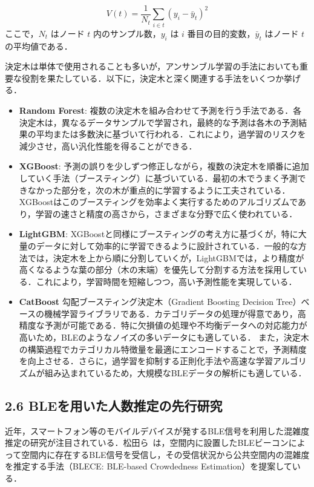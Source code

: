 \begin{equation}
	V(t) = \frac{1}{N_t} \sum_{i \in t} (y_i - \bar{y}_t)^2
\end{equation}
ここで，$N_t$ はノード $t$ 内のサンプル数，$y_i$ は $i$ 番目の目的変数，$\bar{y}_t$ はノード $t$ の平均値である．


決定木は単体で使用されることも多いが，アンサンブル学習の手法においても重要な役割を果たしている．以下に，決定木と深く関連する手法をいくつか挙げる．

\begin{itemize}
	\item \textbf{Random Forest}: 
	複数の決定木を組み合わせて予測を行う手法である\cite{randomforest}．各決定木は，異なるデータサンプルで学習され，最終的な予測は各木の予測結果の平均または多数決に基づいて行われる．これにより，過学習のリスクを減少させ，高い汎化性能を得ることができる．
	
	\item \textbf{XGBoost}:
	予測の誤りを少しずつ修正しながら，複数の決定木を順番に追加していく手法（ブースティング）に基づいている\cite{xgboost}．最初の木でうまく予測できなかった部分を，次の木が重点的に学習するように工夫されている．XGBoostはこのブースティングを効率よく実行するためのアルゴリズムであり，学習の速さと精度の高さから，さまざまな分野で広く使われている．
	
	\item \textbf{LightGBM}:
	XGBoostと同様にブースティングの考え方に基づくが，特に大量のデータに対して効率的に学習できるように設計されている\cite{lightgbm}．一般的な方法では，決定木を上から順に分割していくが，LightGBMでは，より精度が高くなるような葉の部分（木の末端）を優先して分割する方法を採用している．これにより，学習時間を短縮しつつ，高い予測性能を実現している．
	
	\item \textbf{CatBoost}
	勾配ブースティング決定木（Gradient Boosting Decision Tree）ベースの機械学習ライブラリである\cite{catboost}．カテゴリデータの処理が得意であり，高精度な予測が可能である．特に欠損値の処理や不均衡データへの対応能力が高いため，BLEのようなノイズの多いデータにも適している．
	また，決定木の構築過程でカテゴリカル特徴量を最適にエンコードすることで，予測精度を向上させる．さらに，過学習を抑制する正則化手法や高速な学習アルゴリズムが組み込まれているため，大規模なBLEデータの解析にも適している．
	
\end{itemize}

\subsection*{2.6 BLEを用いた人数推定の先行研究}
近年，スマートフォン等のモバイルデバイスが発するBLE信号を利用した混雑度推定の研究が注目されている．松田ら~\cite{senkou}は，空間内に設置したBLEビーコンによって空間内に存在するBLE信号を受信し，その受信状況から公共空間内の混雑度を推定する手法（BLECE: BLE-based Crowdedness Estimation）を提案している．

